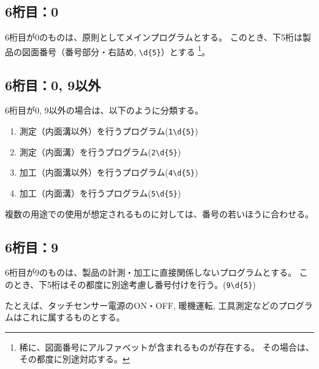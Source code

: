 \subsection{6桁目：0}
6桁目が0のものは、原則としてメインプログラムとする。
このとき、下5桁は製品の図面番号（番号部分・右詰め, \verb|\d{5}|）とする
\footnote{稀に、図面番号にアルファベットが含まれるものが存在する。
その場合は、その都度に別途対応する。}。


\subsection{6桁目：0, 9以外}
6桁目が0, 9以外の場合は、以下のように分類する。
\begin{enumerate}[label=\arabic*., ref=\arabic*, start=1]
\item\label{item:6Mmain} 測定（内面溝以外）を行うプログラム(\verb|1\d{5}|)
\item\label{item:6MD} 測定（内面溝）を行うプログラム(\verb|2\d{5}|)
\setcounter{enumi}{3}
\item\label{item:6Kmain} 加工（内面溝以外）を行うプログラム(\verb|4\d{5}|)
\item\label{item:6KD} 加工（内面溝）を行うプログラム(\verb|5\d{5}|)
\end{enumerate}
複数の用途での使用が想定されるものに対しては、番号の若いほうに合わせる。


\subsection{6桁目：9}
6桁目が9のものは、製品の計測・加工に直接関係しないプログラムとする。
このとき、下5桁はその都度に別途考慮し番号付けを行う。(\verb|9\d{5}|)
\begin{hosoku}
たとえば、タッチセンサー電源のON・OFF, 暖機運転, 工具測定などのプログラムはこれに属するものとする。
\end{hosoku}



